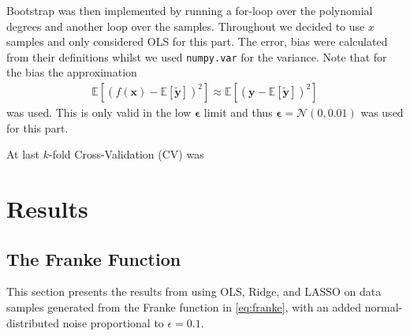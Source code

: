 \documentclass[%
reprint,
amsmath,amssymb,
aps,
pra,
]{revtex4-2}
\begin{document}
Bootstrap was then implemented by running a for-loop over the polynomial degrees and another loop over the samples. Throughout we decided to use $x$ samples and only considered OLS for this part. The error, bias were calculated from their definitions whilst we used \texttt{numpy.var} for the variance. Note that for the bias the approximation
\begin{align}
	\mathbb E[(f(\bm x)-\mathbb E[\tilde{\bm{y}}])^2]\approx \mathbb E[(\bm y-\mathbb E[\tilde{\bm{y}}])^2]
\end{align}
was used. This is only valid in the low $\bm \epsilon$ limit and thus $\bm\epsilon=\mathcal{N}(0, 0.01)$ was used for this part.

At last $k$-fold Cross-Validation (CV) was 



\section{Results}

\subsection{The Franke Function}
This section presents the results from using OLS, Ridge, and LASSO on data samples generated from the Franke function in \eqref{eq:franke}, with an added normal-distributed noise proportional to \(\epsilon=0.1\).
\end{document}
